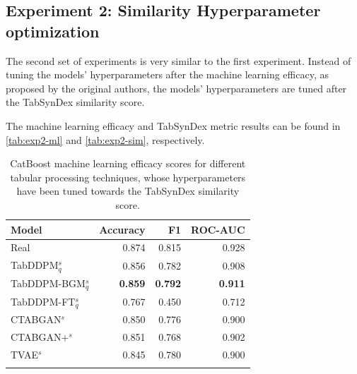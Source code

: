 \subsection{Experiment 2: Similarity Hyperparameter optimization}
\label{ch:Experiment-2}

The second set of experiments is very similar to the first experiment.
Instead of tuning the models' hyperparameters after the machine learning efficacy, as proposed by the original authors,
the models' hyperparameters are tuned after the TabSynDex similarity score.

The machine learning efficacy and TabSynDex metric results can be found in \autoref{tab:exp2-ml} and \autoref{tab:exp2-sim}, respectively.



\begin{table}[h]
	\centering
	\begin{tabular}{lrrr}
		\toprule
		\textbf{Model}        & \textbf{Accuracy} & \textbf{F1}    & \textbf{ROC-AUC} \\
		\midrule
		Real                  & 0.874              & 0.815          & 0.928            \\
		TabDDPM$^{s}_{q}$     & 0.856              & 0.782          & 0.908            \\
		TabDDPM-BGM$^{s}_{q}$ & \textbf{0.859}     & \textbf{0.792} & \textbf{0.911}   \\
		TabDDPM-FT$^{s}_{q}$  & 0.767              & 0.450          & 0.712            \\
		CTABGAN$^{s}$         & 0.850              & 0.776          & 0.900            \\
		CTABGAN+$^{s}$        & 0.851              & 0.768          & 0.902            \\
		TVAE$^{s}$            & 0.845              & 0.780          & 0.900            \\
		\bottomrule
		\multicolumn{4}{c}{}\\[-0.6em]
	\end{tabular}
	\caption[Experiment 2 ML-Efficacy]{CatBoost machine learning efficacy scores for different tabular processing techniques, whose hyperparameters have been tuned towards the TabSynDex similarity score.}
	\label{tab:exp2-ml}
\end{table}

